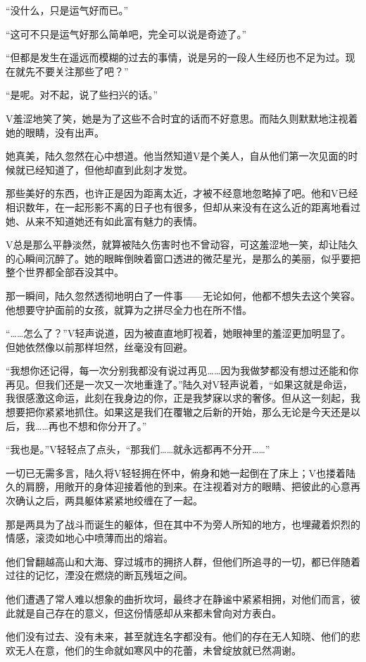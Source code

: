 “没什么，只是运气好而已。”

“这可不只是运气好那么简单吧，完全可以说是奇迹了。”

“但都是发生在遥远而模糊的过去的事情，说是另的一段人生经历也不足为过。现在就先不要关注那些了吧？”

“是呢。对不起，说了些扫兴的话。”

V羞涩地笑了笑，她是为了这些不合时宜的话而不好意思。而陆久则默默地注视着她的眼睛，没有出声。

她真美，陆久忽然在心中想道。他当然知道V是个美人，自从他们第一次见面的时候就已经知道了，但他却直到此刻才发觉。

那些美好的东西，也许正是因为距离太近，才被不经意地忽略掉了吧。他和V已经相识数年，在一起形影不离的日子也有很多，但却从来没有在这么近的距离地看过她、从来不知道她还有如此富有魅力的表情。

V总是那么平静淡然，就算被陆久伤害时也不曾动容，可这羞涩地一笑，却让陆久的心瞬间沉醉了。她的眼眸倒映着窗口透进的微茫星光，是那么的美丽，似乎要把整个世界都全部吞没其中。

那一瞬间，陆久忽然透彻地明白了一件事——无论如何，他都不想失去这个笑容。他想要守护面前的女孩，就算为之拼尽全力也在所不惜。

“……怎么了？”V轻声说道，因为被直直地盯视着，她眼神里的羞涩更加明显了。但她依然像以前那样坦然，丝毫没有回避。

“我想你还记得，每一次分别我都没有说过再见……因为我做梦都没有想过还能和你再见。但我们还是一次又一次地重逢了。”陆久对V轻声说着，“如果这就是命运，我很感激这命运，此刻在我身边的你，正是我梦寐以求的奢侈。但从这一刻起，我想要把你紧紧地抓住。如果这是我们在覆辙之后新的开始，那么无论是今天还是以后，我……再也不想和你分开了。”

“我也是。”V轻轻点了点头，“那我们……就永远都再不分开……”

一切已无需多言，陆久将V轻轻拥在怀中，俯身和她一起倒在了床上；V也搂着陆久的肩膀，用敞开的身体迎接着他的到来。在注视着对方的眼睛、把彼此的心意再次确认之后，两具躯体紧紧地绞缠在了一起。

那是两具为了战斗而诞生的躯体，但在其中不为旁人所知的地方，也埋藏着炽烈的情感，滚烫如地心中喷薄而出的熔岩。

他们曾翻越高山和大海、穿过城市的拥挤人群，但他们所追寻的一切，都已伴随着过往的记忆，湮没在燃烧的断瓦残垣之间。

他们遭遇了常人难以想象的曲折坎坷，最终才在静谧中紧紧相拥，对他们而言，彼此就是自己存在的意义，但这份情感却从来都未曾向对方表白。

他们没有过去、没有未来，甚至就连名字都没有。他们的存在无人知晓、他们的悲欢无人在意，他们的生命就如寒风中的花蕾，未曾绽放就已然凋谢。


